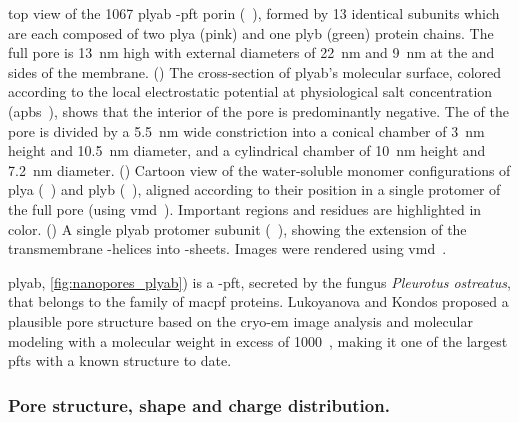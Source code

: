 \begin{figure*}[p]
{  %
  top view of the \SI{1067}{\kDa} \gls{plyab} \tb-\gls{pft} porin
  (~\cite{Lukoyanova-Kondos-2015}), formed by 13 identical subunits which are each composed of two
  \gls{plya} (pink) and one \gls{plyb} (green) protein chains. The full pore is \SI{13}{\nm} high with
  external diameters of \SI{22}{\nm} and \SI{9}{\nm} at the \cisi{} and \transi{} sides of the  membrane. 
  ()
  The cross-section of \gls{plyab}'s molecular surface, colored according to the local electrostatic potential
  at physiological salt concentration (\gls{apbs}~\cite{Baker-2001,Baker-2005}), shows that the interior of
  the pore is predominantly negative. The \lumen{} of the pore is divided by a \SI{5.5}{\nm} wide constriction
  into a conical \cisi{} chamber of \SI{3}{\nm} height and \SI{10.5}{\nm} diameter, and a cylindrical
  \transi{} chamber of \SI{10}{\nm} height and \SI{7.2}{\nm} diameter. 
  ()
  Cartoon view of the water-soluble monomer configurations of \gls{plya}
  (~\cite{Lukoyanova-Kondos-2015}) and \gls{plyb} (~\cite{Lukoyanova-Kondos-2015}),
  aligned according to their position in a single protomer of the full pore (using
  \gls{vmd}~\cite{Humphrey-1996}). Important regions and residues are highlighted in color.
  ()
  A single \gls{plyab} protomer subunit (~\cite{Lukoyanova-Kondos-2015}), showing the extension of
  the transmembrane \ta-helices into \tb-sheets.
  Images were rendered using \gls{vmd}~\cite{Humphrey-1996,Stone-1998}.
  }\label{fig:nanopores_plyab}
\end{figure*}

\Gls{plyab}, \cref{fig:nanopores_plyab}) is a \tb-\gls{pft}, secreted by the fungus \textit{Pleurotus
ostreatus}, that belongs to the family of \gls{macpf} proteins. Lukoyanova and Kondos \etal{} proposed a
plausible pore structure based on the \gls{cryo-em} image analysis and molecular modeling with a molecular
weight in excess of \SI{1000}{\kDa}~\cite{Lukoyanova-Kondos-2015}, making it one of the largest \glspl{pft}
with a known structure to date.


\subsubsection{Pore structure, shape and charge distribution.}
%

